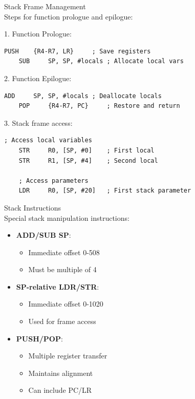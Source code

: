 \begin{KR}{Stack Frame Management}\\
Steps for function prologue and epilogue:

1. Function Prologue:
\begin{lstlisting}[language=armasm, style=base]
    PUSH    {R4-R7, LR}     ; Save registers
    SUB     SP, SP, #locals ; Allocate local vars
\end{lstlisting}

2. Function Epilogue:
\begin{lstlisting}[language=armasm, style=base]
    ADD     SP, SP, #locals ; Deallocate locals
    POP     {R4-R7, PC}     ; Restore and return
\end{lstlisting}

3. Stack frame access:
\begin{lstlisting}[language=armasm, style=base]
    ; Access local variables
    STR     R0, [SP, #0]    ; First local
    STR     R1, [SP, #4]    ; Second local
    
    ; Access parameters
    LDR     R0, [SP, #20]   ; First stack parameter
\end{lstlisting}
\end{KR}

\begin{concept}{Stack Instructions}\\
Special stack manipulation instructions:
\begin{itemize}
  \item \textbf{ADD/SUB SP}:
    \begin{itemize}
      \item Immediate offset 0-508
      \item Must be multiple of 4
    \end{itemize}
  \item \textbf{SP-relative LDR/STR}:
    \begin{itemize}
      \item Immediate offset 0-1020
      \item Used for frame access
    \end{itemize}
  \item \textbf{PUSH/POP}:
    \begin{itemize}
      \item Multiple register transfer
      \item Maintains alignment
      \item Can include PC/LR
    \end{itemize}
\end{itemize}
\end{concept}

